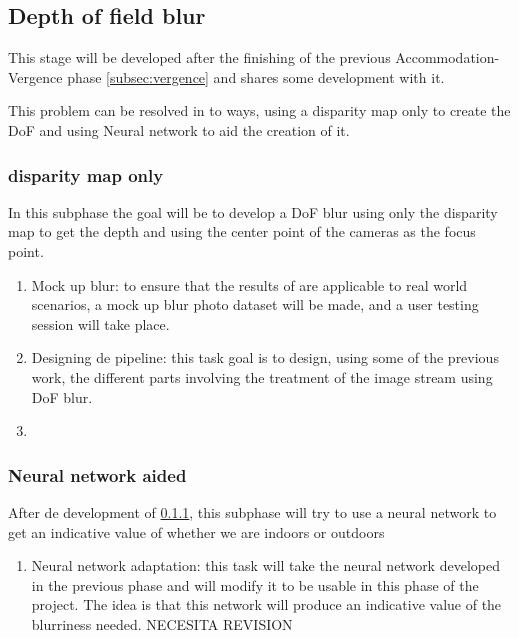 \documentclass[10pt,a4paper,twocolumn,twoside]{article}
\begin{document}
\subsection{Depth of field blur}
This stage will be developed after the finishing of the previous Accommodation-Vergence phase \ref{subsec:vergence} and shares some development with it. 

This problem can be resolved in to ways, using a disparity map only to create the DoF and using Neural network to aid the creation of it.


\subsubsection{disparity map only}
\label{subsubsec:disparityOnly}
In this subphase the goal will be to develop a DoF blur using only the disparity map to get the depth and using the center point of the cameras as the focus point.
\begin{enumerate}
	\item Mock up blur: to ensure that the results of \cite{ifftConfortDoF} are applicable to real world scenarios, a mock up blur photo dataset will be made, and a user testing session will take place.
	
	\item Designing de pipeline: this task goal is to design, using some of the previous work, the different parts involving the treatment of the image stream using DoF blur.
	
	\item 
\end{enumerate}

\subsubsection{Neural network aided}
After de development of \ref{subsubsec:disparityOnly}, this subphase will try to use a neural network to get an indicative value of whether we are indoors or outdoors 

\begin{enumerate}
	\item Neural network adaptation: this task will take the neural network developed in the previous phase and will modify it to be usable in this phase of the project. The idea is that this network will produce an indicative value of the blurriness needed. NECESITA REVISION

\end{enumerate}
\end{document}
